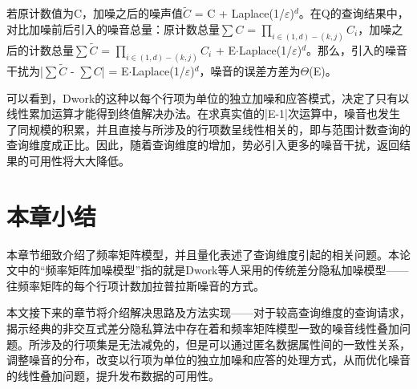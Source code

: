 若原计数值为C，加噪之后的噪声值$\widetilde{C}$ = C + Laplace(1/$\varepsilon$)$^d$。在Q的查询结果中，对比加噪前后引入的噪音总量：原计数总量$\sum{C}$ = \(\prod\nolimits_{i \in (1,d) - (k,j)} {C{_i}} \)，加噪之后的计数总量$\sum{\widetilde{C}}$ = \(\prod\nolimits_{i \in (1,d) - (k,j)} {C{_i}} \) + E$\cdotp$Laplace(1/$\varepsilon$)$^d$。那么，引入的噪音干扰为|$\sum{\widetilde{C}}$ - $\sum{C}$| = E$\cdotp$Laplace(1/$\varepsilon$)$^d$，噪音的误差方差为$\Theta$(E)。

可以看到，Dwork的这种以每个行项为单位的独立加噪和应答模式，决定了只有以线性累加运算才能得到终值解决办法。在求真实值的|E-1|次运算中，噪音也发生了同规模的积累，并且直接与所涉及的行项数呈线性相关的，即与范围计数查询的查询维度成正比。因此，随着查询维度的增加，势必引入更多的噪音干扰，返回结果的可用性将大大降低。

\section{本章小结}

本章节细致介绍了频率矩阵模型，并且量化表述了查询维度引起的相关问题。本论文中的“频率矩阵加噪模型”指的就是Dwork等人采用的传统差分隐私加噪模型——往频率矩阵的每个行项计数加拉普拉斯噪音的方式。

本文接下来的章节将介绍解决思路及方法实现——对于较高查询维度的查询请求，揭示经典的非交互式差分隐私算法中存在着和频率矩阵模型一致的噪音线性叠加问题。所涉及的行项集是无法减免的，但是可以通过匿名数据属性间的一致性关系，调整噪音的分布，改变以行项为单位的独立加噪和应答的处理方式，从而优化噪音的线性叠加问题，提升发布数据的可用性。


